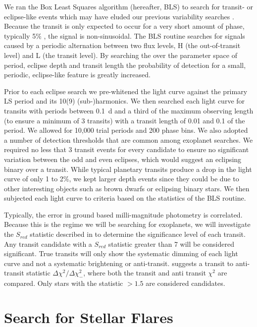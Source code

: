 We ran the Box Least Squares algorithm (hereafter, BLS) to search for transit- or eclipse-like events which may have eluded our previous variability searches \citep{Kovacs2005}. Because the transit is only expected to occur for a very short amount of phase, typically 5\% \citep{Charbonneau2000}, the signal is non-sinusoidal. The BLS routine searches for signals caused by a periodic alternation between two flux levels, H (the out-of-transit level) and L (the transit level). By searching the over the parameter space of period, eclipse depth and transit length the probability of detection for a small, periodic, eclipse-like feature is greatly increased. 

Prior to each eclipse search we pre-whitened the light curve against the primary LS period and its 10(9) (sub-)harmonics. We then searched each light curve for transits with periods between 0.1~d and a third of the maximum observing length (to ensure a minimum of 3 transits) with a transit length of 0.01 and 0.1 of the period. We allowed for 10,000 trial periods and 200 phase bins. We also adopted a number of detection thresholds that are common among exoplanet searches. We required no less that 3 transit events for every candidate to ensure no significant variation between the odd and even eclipses, which would suggest an eclipsing binary over a transit. While typical planetary transits produce a drop in the light curve of only 1 to 2\%, we kept larger depth events since they could be due to other interesting objects such as brown dwarfs or eclipsing binary stars. We then subjected each light curve to criteria based on the statistics of the BLS routine. 

Typically, the error in ground based milli-magnitude photometry is correlated. Because this is the regime we will be searching for exoplanets, we will investigate the $S_{red}$ statistic described in \citet{Pont2006} to determine the significance level of each transit. Any transit candidate with a $S_{red}$ statistic greater than 7 will be considered significant. True transits will only show the systematic dimming of each light curve and not a systematic brightening or anti-transit. \citet{Burke2006} suggests a transit to anti-transit statistic $\Delta \chi^2 / \Delta \chi_{-}^2$, where both the transit and anti transit $\chi^2$ are compared. Only stars with the statistic $>1.5$ are considered candidates. 

\section{Search for Stellar Flares \label{subsec:flr}}


